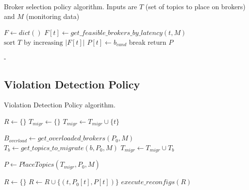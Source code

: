 \begin{algorithm}
\caption{Broker selection policy algorithm. Inputs are $T$ (set of topics to place on brokers) and $M$ (monitoring data)}\label{broker_sel_algo}
\begin{algorithmic}[1]
\State $F \gets dict\left(\right)$
    \State $F \left[ t \right] \gets get\_feasible\_brokers\_by\_latency \left( t , M\right)$
\EndFor
\State $\text{sort } T \text{ by increasing } |F \left[ t \right]|$
         
            \State $P \left[ t \right] \gets b_{cand}$
            \State break
        \EndIf
    \EndFor
\EndFor
\State $\text{return } P$
\EndProcedure
\end{algorithmic}
\end{algorithm}

- 

\subsection{Violation Detection Policy}
\begin{algorithm}
\caption{Violation Detection Policy algorithm. }\label{viol_detection_algo}
\begin{algorithmic}[1]
\State $R \gets \{\}$ 
\State $T_{migr} \gets \{\}$ 
        \State $T_{migr} \gets T_{migr} \cup \{ t \}$
    \EndIf
\EndFor

\State $B_{overload} \gets get\_overloaded\_brokers \left( P_0, M \right)$
 
    \State $T_b \gets get\_topics\_to\_migrate\left(b, P_0, M\right)$
    \State $T_{migr} \gets T_{migr} \cup T_b$
\EndFor

\State $P \gets PlaceTopics \left( T_{migr}, P_0, M \right)$ 

\State $R \gets \{\}$ 
        \State $R \gets R \cup \{ \left( t, P_0 \left[ t \right], P \left[ t \right]\right) \}$
    \EndIf
\EndFor
\State $execute\_reconfigs \left( R \right)$ 
\EndProcedure
\end{algorithmic}
\end{algorithm}

